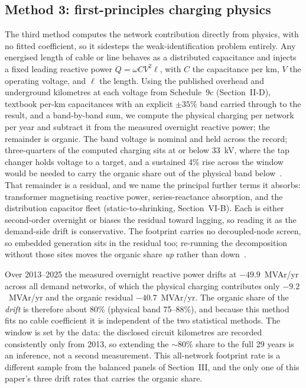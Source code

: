\documentclass[journal]{IEEEtran}
\begin{document}
\subsection{Method 3: first-principles charging physics}
The third method computes the network contribution directly from physics, with no
fitted coefficient, so it sidesteps the weak-identification problem entirely. Any
energised length of cable or line behaves as a distributed capacitance and
injects a fixed leading reactive power $Q=\omega C V^2 \ell$, with $C$ the
capacitance per km, $V$ the operating voltage, and $\ell$ the length. Using the
published overhead and underground kilometres at each voltage from Schedule~9c
(Section~II-D), textbook per-km capacitances with an explicit $\pm 35\%$ band
carried through to the result, and a band-by-band sum, we compute the physical charging per network
per year and subtract it from the measured overnight reactive power; the
remainder is organic. The band voltage is nominal and held across the record;
three-quarters of the computed charging sits at or below 33~kV, where the tap
changer holds voltage to a target, and a sustained 4\% rise across the window
would be needed to carry the organic share out of the physical band
below~\cite{hume_extended}. That remainder is a residual, and we name the principal further terms it
absorbs: transformer magnetising reactive power, series-reactance absorption, and
the distribution capacitor fleet (static-to-shrinking, Section~VI-B). Each is either second-order overnight or biases the residual toward lagging, so
reading it as the demand-side drift is conservative. The footprint carries no
decoupled-node screen, so embedded generation sits in the residual too; re-running
the decomposition without those sites moves the organic share \emph{up} rather
than down~\cite{hume_extended}.

Over 2013--2025 the measured overnight reactive power drifts at $-49.9$~MVAr/yr
across all demand networks, of which the physical charging contributes only
$-9.2$~MVAr/yr and the organic residual $-40.7$~MVAr/yr. The organic share of the
\emph{drift} is therefore about 80\% (physical band 75--88\%), and because this
method fits no cable coefficient it is independent of the two statistical
methods. The window is set by the data: the disclosed circuit kilometres are
recorded consistently only from 2013, so extending the $\sim$80\% share to the
full 29 years is an inference, not a second measurement. This all-network
footprint rate is a different sample from the balanced panels of Section~III, and the only
one of this paper's three drift rates that carries the organic share.
\end{document}
